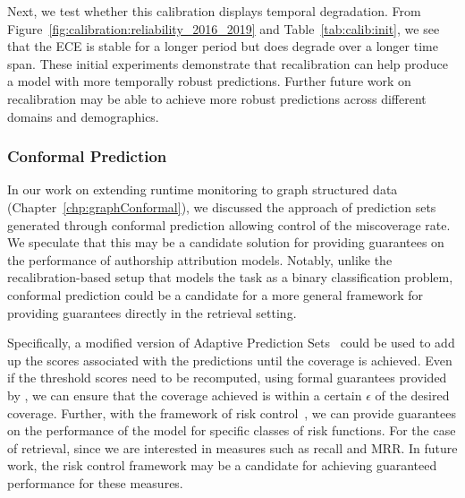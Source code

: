 Next, we test whether this calibration displays temporal degradation.
From Figure~\ref{fig:calibration:reliability_2016_2019} and Table~\ref{tab:calib:init}, we see that the ECE is stable for a longer period but does degrade over a longer time span.
These initial experiments demonstrate that recalibration can help produce a model with more temporally robust predictions.
Further future work on recalibration may be able to achieve more robust predictions across different domains and demographics.

\subsubsection{Conformal Prediction}
In our work on extending runtime monitoring to graph structured data (Chapter~\ref{chp:graphConformal}), we discussed the approach of prediction sets generated through conformal prediction allowing control of the miscoverage rate.
We speculate that this may be a candidate solution for providing guarantees on the performance of authorship attribution models.
Notably, unlike the recalibration-based setup that models the task as a binary classification problem, conformal prediction could be a candidate for a more general framework for providing guarantees directly in the retrieval setting.

Specifically, a modified version of Adaptive Prediction Sets~\cite{romano2020classification} could be used to add up the scores associated with the predictions until the coverage is achieved.
Even if the threshold scores need to be recomputed, using formal guarantees provided by \citep{vovk2005algorithmic}, we can ensure that the coverage achieved is within a certain $\epsilon$ of the desired coverage.
Further, with the framework of risk control~\cite{angelopoulos2024conformal}, we can provide guarantees on the performance of the model for specific classes of risk functions.
For the case of retrieval, since we are interested in measures such as recall and MRR.
In future work, the risk control framework may be a candidate for achieving guaranteed performance for these measures.


